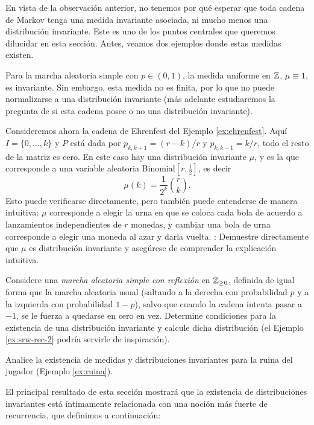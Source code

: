 En vista de la observación anterior, no tenemos por qué esperar que toda cadena de Markov tenga una medida invariante asociada, ni mucho menos una distribución invariante.
Este es uno de los puntos centrales que queremos dilucidar en esta sección.
Antes, veamos dos ejemplos donde estas medidas existen.

\begin{ex}
Para la marcha aleatoria simple con $p\in(0,1)$, la medida uniforme en $\mathbb{Z}$, $\mu\equiv1$, es invariante.
Sin embargo, esta medida no es finita, por lo que no puede normalizarse a una distribución invariante (más adelante estudiaremos la pregunta de si esta cadena posee o no una distribución invariante).
\end{ex}

\begin{ex}
Consideremos ahora la cadena de Ehrenfest del Ejemplo \ref{ex:ehrenfest}.
Aquí $I=\{0,\dotsc,k\}$ y $P$ está dada por $p_{k,k+1}=(r-k)/r$ y $p_{k,k-1}=k/r$, todo el resto de la matriz es cero.
En este caso hay una distribución invariante $\mu$, y es la que corresponde a una variable aleatoria Binomial$[r,\frac12]$, es decir
\[\mu(k)=\frac1{2^k}\binom{r}{k}.\]
Esto puede verificarse directamente, pero también puede entenderse de manera intuitiva: $\mu$ corresponde a elegir la urna en que se coloca cada bola de acuerdo a lanzamientos independientes de $r$ monedas, y cambiar una bola de urna corresponde a elegir una moneda al azar y darla vuelta.
\uexer: Demuestre directamente que $\mu$ es distribución invariante y asegúrese de comprender la explicación intuitiva.
\end{ex}

\begin{exer}
Considere una \emph{marcha aleatoria simple con reflexión} en $\mathbb{Z}_{\geq0}$, definida de igual forma que la marcha aleatoria usual (saltando a la derecha con probabilidad $p$ y a la izquierda con probabilidad $1-p$), salvo que cuando la cadena intenta pasar a $-1$, se le fuerza a quedarse en cero en vez.
Determine condiciones para la existencia de una distribución invariante y calcule dicha distribución (el Ejemplo \ref{ex:srw-rec-2} podría servirle de inspiración).
\end{exer}

\begin{exer}
Analice la existencia de medidas y distribuciones invariantes para la ruina del jugador (Ejemplo \ref{ex:ruina}).
\end{exer}

El principal resultado de esta sección mostrará que la existencia de distribuciones invariantes está íntimamente relacionada con una noción más fuerte de recurrencia, que definimos a continuación:

